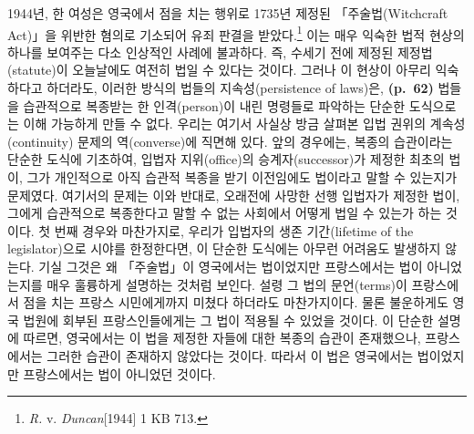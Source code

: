 1944년, 한 여성은 영국에서 점을 치는 행위로 1735년 제정된
「주술법(Witchcraft Act)」을 위반한 혐의로 기소되어 유죄 판결을
받았다.\footnote{\emph{R.} v. \emph{Duncan}{[}1944{]} 1 KB 713.} 이는
매우 익숙한 법적 현상의 하나를 보여주는 다소 인상적인 사례에 불과하다.
즉, 수세기 전에 제정된 제정법(statute)이 오늘날에도 여전히 법일 수
있다는 것이다. 그러나 이 현상이 아무리 익숙하다고 하더라도, 이러한
방식의 법들의 지속성(persistence of laws)은, \textbf{(p.~62)} 법들을
습관적으로 복종받는 한 인격(person)이 내린 명령들로 파악하는 단순한
도식으로는 이해 가능하게 만들 수 없다. 우리는 여기서 사실상 방금 살펴본
입법 권위의 계속성(continuity) 문제의 역(converse)에 직면해 있다. 앞의
경우에는, 복종의 습관이라는 단순한 도식에 기초하여, 입법자
지위(office)의 승계자(successor)가 제정한 최초의 법이, 그가 개인적으로
아직 습관적 복종을 받기 이전임에도  법이라고 말할 수
있는지가 문제였다. 여기서의 문제는 이와 반대로, 오래전에 사망한 선행
입법자가 제정한 법이, 그에게 습관적으로 복종한다고 말할 수 없는 사회에서
어떻게  법일 수 있는가 하는 것이다. 첫 번째 경우와
마찬가지로, 우리가 입법자의 생존 기간(lifetime of the legislator)으로
시야를 한정한다면, 이 단순한 도식에는 아무런 어려움도 발생하지 않는다.
기실 그것은 왜 「주술법」이 영국에서는 법이었지만 프랑스에서는 법이
아니었는지를 매우 훌륭하게 설명하는 것처럼 보인다. 설령 그 법의
문언(terms)이 프랑스에서 점을 치는 프랑스 시민에게까지 미쳤다 하더라도
마찬가지이다. 물론 불운하게도 영국 법원에 회부된 프랑스인들에게는 그
법이 적용될 수 있었을 것이다. 이 단순한 설명에 따르면, 영국에서는 이
법을 제정한 자들에 대한 복종의 습관이 존재했으나, 프랑스에서는 그러한
습관이 존재하지 않았다는 것이다. 따라서 이 법은 영국에서는 법이었지만
프랑스에서는 법이 아니었던 것이다.

